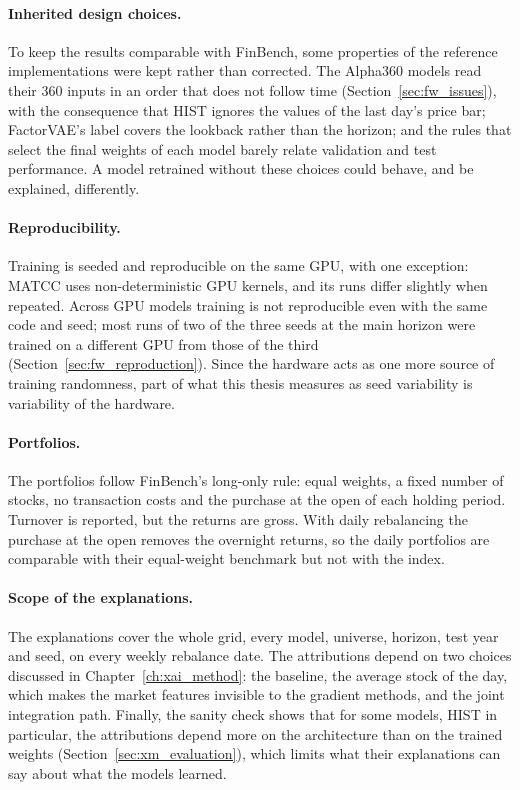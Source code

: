 \paragraph{Inherited design choices.} To keep the results comparable with FinBench, some properties of the reference implementations were kept rather than corrected. The Alpha360 models read their 360 inputs in an order that does not follow time (Section~\ref{sec:fw_issues}), with the consequence that HIST ignores the values of the last day's price bar; FactorVAE's label covers the lookback rather than the horizon; and the rules that select the final weights of each model barely relate validation and test performance. A model retrained without these choices could behave, and be explained, differently.

\paragraph{Reproducibility.} Training is seeded and reproducible on the same GPU, with one exception: MATCC uses non-deterministic GPU kernels, and its runs differ slightly when repeated. Across GPU models training is not reproducible even with the same code and seed; most runs of two of the three seeds at the main horizon were trained on a different GPU from those of the third (Section~\ref{sec:fw_reproduction}). Since the hardware acts as one more source of training randomness, part of what this thesis measures as seed variability is variability of the hardware.

\paragraph{Portfolios.} The portfolios follow FinBench's long-only rule: equal weights, a fixed number of stocks, no transaction costs and the purchase at the open of each holding period. Turnover is reported, but the returns are gross. With daily rebalancing the purchase at the open removes the overnight returns, so the daily portfolios are comparable with their equal-weight benchmark but not with the index.

\paragraph{Scope of the explanations.} The explanations cover the whole grid, every model, universe, horizon, test year and seed, on every weekly rebalance date. %
The attributions depend on two choices discussed in Chapter~\ref{ch:xai_method}: the baseline, the average stock of the day, which makes the market features invisible to the gradient methods, and the joint integration path. Finally, the sanity check shows that for some models, HIST in particular, the attributions depend more on the architecture than on the trained weights (Section~\ref{sec:xm_evaluation}), which limits what their explanations can say about what the models learned.

